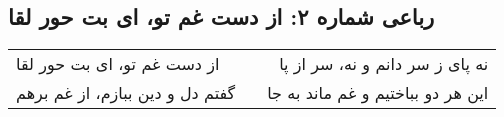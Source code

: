 \begin{center}
\section*{رباعی شماره ۲: از دست غم تو، ای بت حور لقا}
\label{sec:002}
\begin{longtable}{l p{0.5cm} r}
از دست غم تو، ای بت حور لقا
&&
نه پای ز سر دانم و نه، سر از پا
\\
گفتم دل و دین ببازم، از غم برهم
&&
این هر دو بباختیم و غم ماند به جا
\\
\end{longtable}
\end{center}
